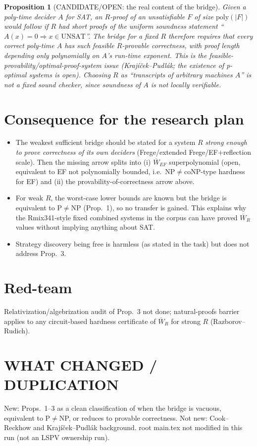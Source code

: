 \documentclass{article}
\newtheorem{proposition}{Proposition}
\begin{document}
\begin{proposition}[CANDIDATE/OPEN: the real content of the bridge]
Given a poly-time decider $A$ for SAT, an $R$-proof of an unsatisfiable $F$ of size $\mathrm{poly}(|F|)$ would follow if $R$ had short proofs of the uniform soundness statement ``$A(x)=0\Rightarrow x\in\mathrm{UNSAT}$''. The bridge for a \emph{fixed} $R$ therefore requires that every correct poly-time $A$ has such feasible $R$-provable correctness, with proof length depending only polynomially on $A$'s run-time exponent. This is the feasible-provability/optimal-proof-system issue (Kraj\'i\v cek--Pudl\'ak; the existence of p-optimal systems is open). Choosing $R$ as ``transcripts of arbitrary machines $A$'' is not a fixed sound checker, since soundness of $A$ is not locally verifiable.
\end{proposition}

\section*{Consequence for the research plan}
\begin{itemize}
\item The weakest sufficient bridge should be stated for a system $R$ \emph{strong enough to prove correctness of its own deciders} (Frege/extended Frege/EF$+$reflection scale). Then the missing arrow splits into (i) $\overline W_{EF}$ superpolynomial (open, equivalent to EF not polynomially bounded, i.e.\ $\mathrm{NP}\ne\mathrm{coNP}$-type hardness for EF) and (ii) the provability-of-correctness arrow above.
\item For weak $R$, the worst-case lower bounds are known but the bridge is equivalent to $\mathrm P\ne\mathrm{NP}$ (Prop.~1), so no transfer is gained. This explains why the Rmix341-style fixed combined systems in the corpus can have proved $\overline W_R$ values without implying anything about SAT.
\item Strategy discovery being free is harmless (as stated in the task) but does not address Prop.~3.
\end{itemize}

\section*{Red-team}
Relativization/algebrization audit of Prop.~3 not done; natural-proofs barrier applies to any circuit-based hardness certificate of $\overline W_R$ for strong $R$ (Razborov--Rudich). 

\section*{WHAT CHANGED / DUPLICATION}
New: Props.~1--3 as a clean classification of when the bridge is vacuous, equivalent to P$\ne$NP, or reduces to provable correctness. Not new: Cook--Reckhow and Kraj\'i\v cek--Pudl\'ak background. root main.tex not modified in this run (not an LSPV ownership run).
\end{document}
